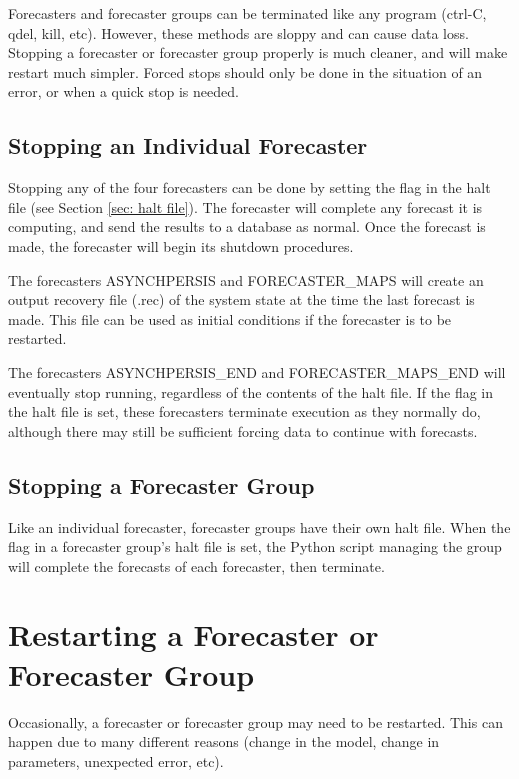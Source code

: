\documentclass[12pt]{article}
\begin{document}
Forecasters and forecaster groups can be terminated like any program (ctrl-C, qdel, kill, etc). However, these methods are sloppy and can cause data loss. Stopping a forecaster or forecaster group properly is much cleaner, and will make restart much simpler. Forced stops should only be done in the situation of an error, or when a quick stop is needed.

\subsection{Stopping an Individual Forecaster} \label{sec: stopping forecaster}

Stopping any of the four forecasters can be done by setting the flag in the halt file (see Section \ref{sec: halt file}). The forecaster will complete any forecast it is computing, and send the results to a database as normal. Once the forecast is made, the forecaster will begin its shutdown procedures.

The forecasters ASYNCHPERSIS and FORECASTER\_MAPS will create an output recovery file (.rec) of the system state at the time the last forecast is made. This file can be used as initial conditions if the forecaster is to be restarted.

The forecasters ASYNCHPERSIS\_END and FORECASTER\_MAPS\_END will eventually stop running, regardless of the contents of the halt file. If the flag in the halt file is set, these forecasters terminate execution as they normally do, although there may still be sufficient forcing data to continue with forecasts.

\subsection{Stopping a Forecaster Group} \label{sec: stopping forecaster group}

Like an individual forecaster, forecaster groups have their own halt file. When the flag in a forecaster group's halt file is set, the Python script managing the group will complete the forecasts of each forecaster, then terminate.

\section{Restarting a Forecaster or Forecaster Group} \label{sec: restarting}

Occasionally, a forecaster or forecaster group may need to be restarted. This can happen due to many different reasons (change in the model, change in parameters, unexpected error, etc).
\end{document}
